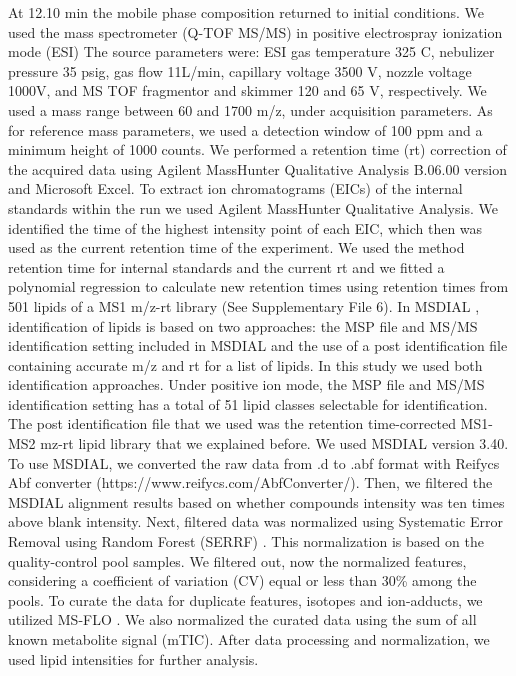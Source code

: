 \documentclass[9pt,twocolumn,twoside,lineno]{BioRxiv}
\begin{document}
At 12.10 min the mobile phase composition returned to initial conditions.
We used the mass spectrometer (Q-TOF MS/MS) in positive electrospray ionization mode (ESI)
The source parameters were: ESI gas temperature 325 \degree C, nebulizer pressure 35 psig, gas flow 11L/min, capillary voltage 3500 V, nozzle voltage 1000V, and MS TOF fragmentor and skimmer 120 and 65 V, respectively.
We used a mass range between 60 and 1700 m/z, under acquisition parameters. 
As for reference mass parameters, we used a detection window of 100 ppm and a minimum height of 1000 counts. 
We performed a retention time (rt) correction of the acquired data using Agilent MassHunter Qualitative Analysis B.06.00 version and Microsoft Excel. 
To extract ion chromatograms (EICs) of the internal standards within the run we used Agilent MassHunter Qualitative Analysis.
We identified the time of the highest intensity point of each EIC, which then was used as the current retention time of the experiment. 
We used the method retention time for internal standards and the current rt and we fitted a polynomial regression to calculate new retention times using retention times from 501 lipids of a MS1 m/z-rt library (See Supplementary File 6). 
In MSDIAL \cite{Tsugawa2015-kh}, identification of lipids is based on two approaches: the MSP file and MS/MS identification setting included in MSDIAL and the use of a post identification file containing accurate m/z and rt for a list of lipids. 
In this study we used both identification approaches. 
Under positive ion mode, the MSP file and MS/MS identification setting has a total of 51 lipid classes  selectable for identification. 
The post identification file that we used was the retention time-corrected MS1-MS2 mz-rt lipid library that we explained before. 
We used MSDIAL \cite{Tsugawa2015-kh} version 3.40. 
To use MSDIAL, we converted the raw data from .d to .abf format with Reifycs Abf converter (https://www.reifycs.com/AbfConverter/). 
Then, we filtered the MSDIAL alignment results based on whether compounds intensity was ten times above blank intensity. Next, filtered data was normalized using Systematic Error Removal using Random Forest (SERRF) \cite{Fan2019}. This normalization is based on the quality-control pool samples. 
We filtered out, now the normalized features, considering a coefficient of variation (CV) equal or less than 30\% among the pools. 
To curate the data for duplicate features, isotopes and ion-adducts, we utilized MS-FLO \cite{DeFelice2017-ms}.
We also normalized the curated data using the sum of all known metabolite signal (mTIC). 
After data processing and normalization, we used lipid intensities for further analysis.
\end{document}
